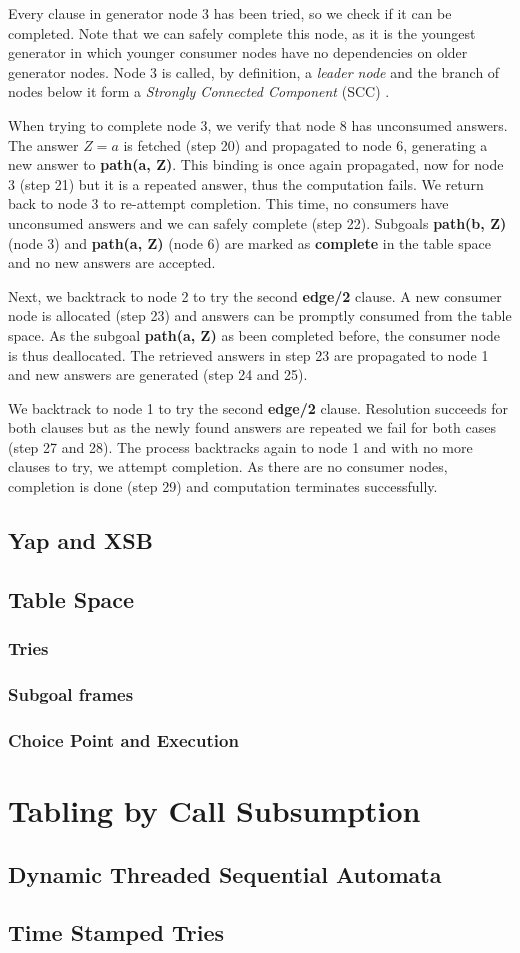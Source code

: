 Every clause in generator node 3 has been tried, so we check if it can be completed. Note that we can safely complete this node,
as it is the youngest generator in which younger consumer nodes have no dependencies on older generator nodes.
Node 3 is called, by definition, a \textit{leader node} and the branch of nodes
below it form a \textit{Strongly Connected Component} (SCC) \cite{Tarjan-72}.

When trying to complete node 3, we verify that node 8 has unconsumed answers. The answer $Z = a$ is fetched (step 20) and propagated
to node 6, generating a new answer to \textbf{path(a, Z)}. This binding is once again propagated, now for node 3 (step 21) but it is
a repeated answer, thus the computation fails. We return back to node 3 to re-attempt completion. This time, no consumers have unconsumed
answers and we can safely complete (step 22). Subgoals \textbf{path(b, Z)} (node 3) and \textbf{path(a, Z)} (node 6) are marked as \textbf{complete}
in the table space and no new answers are accepted.

Next, we backtrack to node 2 to try the second \textbf{edge/2} clause. A new consumer node is allocated (step 23) and answers can be
promptly consumed from the table space. As the subgoal \textbf{path(a, Z)} as been completed before, the consumer node is thus deallocated.
The retrieved answers in step 23 are propagated to node 1 and new answers are generated (step 24 and 25).

We backtrack to node 1 to try the second \textbf{edge/2} clause. Resolution succeeds for both clauses but as the newly found answers
are repeated we fail for both cases (step 27 and 28). The process backtracks again to node 1 and with no more clauses to try,
we attempt completion. As there are no consumer nodes, completion is done (step 29) and computation terminates successfully.




  \subsection{Yap and XSB}
  
  \subsection{Table Space}
    \subsubsection{Tries}
    \subsubsection{Subgoal frames}
    \subsubsection{Choice Point and Execution}

\section{Tabling by Call Subsumption}
  \subsection{Dynamic Threaded Sequential Automata}
  \subsection{Time Stamped Tries}


